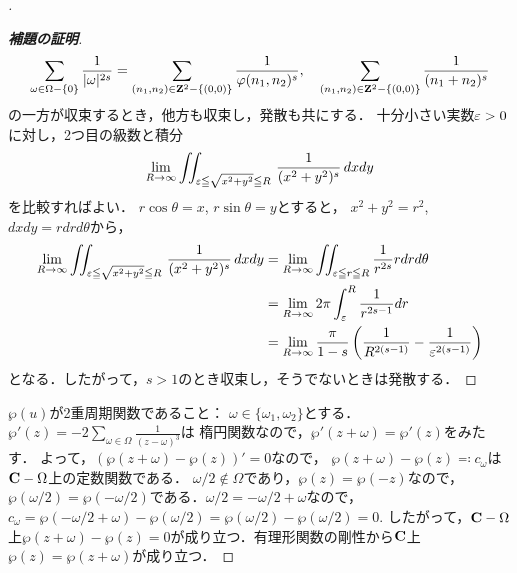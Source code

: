 \begin{proof}[\pfb]
\begin{proof}[\textbf{補題の証明}]
        \begin{align*}
            \sum_{\omega\in\Omega-\{0\}}\frac{1}{|\omega|^{2s}}
            =\sum_{(n_1,n_2)\in\mathbf{Z}^2-\{(0,0)\}}\frac{1}{\varphi(n_1,n_2)^s},\quad
            \sum_{(n_1,n_2)\in\mathbf{Z}^2-\{(0,0)\}}\frac{1}{(n_1+n_2)^s}
        \end{align*}
        の一方が収束するとき，他方も収束し，発散も共にする．
        十分小さい実数$\varepsilon>0$に対し，2つ目の級数と積分
        \begin{align*}
            \lim_{R\to\infty}\iint_{\varepsilon\leqq\sqrt{x^2+y^2}\leqq R}\,\frac{1}{(x^2+y^2)^s}\,dxdy
        \end{align*}
        を比較すればよい．
        $r\cos\theta=x$, $r\sin\theta=y$とすると，
        $x^2+y^2=r^2$, $dxdy=rdrd\theta$から，
        \begin{align*}
            \lim_{R\to\infty}\iint_{\varepsilon\leqq\sqrt{x^2+y^2}\leqq R}\,\frac{1}{(x^2+y^2)^s}\,dxdy
            &=
            \lim_{R\to\infty}
            \iint_{\varepsilon\leqq r\leqq R}\frac{1}{r^{2s}}rdrd\theta\\
            &=
            \lim_{R\to\infty} 2\pi\int_{\varepsilon}^{R}\frac{1}{r^{2s-1}}dr\\
            &=
            \lim_{R\to\infty}\frac{\pi}{1-s}\left(\frac{1}{R^{2(s-1)}}-\frac{1}{\varepsilon^{2(s-1)}}\right)
        \end{align*}
        となる．したがって，$s>1$のとき収束し，そうでないときは発散する．
    \end{proof}


    $\wp(u)$が2重周期関数であること：
    $\omega\in\{\omega_1,\omega_2\}$とする．$\wp'(z)=-2\sum_{\omega\in\Omega}\frac{1}{(z-\omega)^3}$は
    楕円関数なので，$\wp'(z+\omega)=\wp'(z)$をみたす．
    よって，$(\wp(z+\omega)-\wp(z))'=0$なので，
    $\wp(z+\omega)-\wp(z)\eqqcolon c_{\omega}$は$\mathbf{C}-\Omega$上の定数関数である．
    $\omega/2\notin\Omega$であり，$\wp(z)=\wp(-z)$なので，
    $\wp(\omega/2)=\wp(-\omega/2)$である．$\omega/2=-\omega/2+\omega$なので，
    $c_\omega=\wp(-\omega/2+\omega)-\wp(\omega/2)=\wp(\omega/2)-\wp(\omega/2)=0$. 
    したがって，$\mathbf{C}-\Omega$上$\wp(z+\omega)-\wp(z)=0$が成り立つ．有理形関数の剛性から$\mathbf{C}$上$\wp(z)=\wp(z+\omega)$が成り立つ．
\end{proof}
